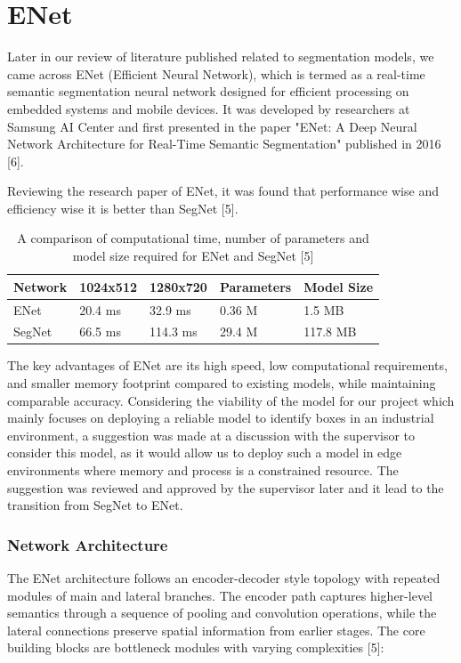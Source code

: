 \chapter{ENet}
Later in our review of literature published related to segmentation models, we came across ENet (Efficient Neural Network), which is termed as a real-time semantic segmentation neural network designed for efficient processing on embedded systems and mobile devices. It was developed by researchers at Samsung AI Center and first presented in the paper "ENet: A Deep Neural Network Architecture for Real-Time Semantic Segmentation" published in 2016 [6].

Reviewing the research paper of ENet, it was found that performance wise and efficiency wise it is better than SegNet [5].

\begin{table}[h!]
	\centering
	\setlength{\arrayrulewidth}{0.5mm}
	\setlength{\tabcolsep}{18pt}
	\renewcommand{\arraystretch}{1.5}
	\begin{tabular}{ |p{1.5cm}|p{1.8cm}|p{1.8cm}|p{2cm}|p{2cm}| }
		\hline
		Network & 1024x512 & 1280x720 & Parameters & Model Size \\
		\hline
		ENet    & 20.4 ms  & 32.9 ms  & 0.36 M     & 1.5 MB     \\
		\hline
		SegNet  & 66.5 ms  & 114.3 ms & 29.4 M     & 117.8 MB   \\
		\hline
	\end{tabular}
	\caption{A comparison of computational time, number of parameters and model size required for ENet and SegNet [5]}
	\label{table:1}
\end{table}

The key advantages of ENet are its high speed, low computational requirements, and smaller memory footprint compared to existing models, while maintaining comparable accuracy. Considering the viability of the model for our project which mainly focuses on deploying a reliable model to identify boxes in an industrial environment, a suggestion was made at a discussion with the supervisor to consider this model, as it would allow us to deploy such a model in edge environments where memory and process is a constrained resource. The suggestion was reviewed and approved by the supervisor later and it lead to the transition from SegNet to ENet.

\subsection{Network Architecture}
The ENet architecture follows an encoder-decoder style topology with repeated modules of main and lateral branches. The encoder path captures higher-level semantics through a sequence of pooling and convolution operations, while the lateral connections preserve spatial information from earlier stages. The core building blocks are bottleneck modules with varying complexities [5]:

